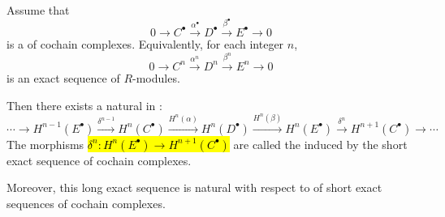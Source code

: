 \begin{theorem}
\begin{enumerate}
    Assume that 
    \[
    0 \longrightarrow C^\bullet \xrightarrow{\alpha^\bullet} D^\bullet \xrightarrow{\beta^\bullet} E^\bullet \longrightarrow 0
    \]
    is a  
    of cochain complexes. Equivalently, for each integer $n$, 
    \[
    0 \to C^n \xrightarrow{\alpha^n} D^n \xrightarrow{\beta^n} E^n \to 0
    \]
    is an exact sequence of $R$-modules.

    Then there exists a natural  in :
    \[
    \cdots \longrightarrow H^{n-1}(E^\bullet) 
    \xrightarrow{\delta^{n-1}} H^{n}(C^\bullet)
    \xrightarrow{H^{n}(\alpha)} H^{n}(D^\bullet)
    \xrightarrow{H^{n}(\beta)} H^{n}(E^\bullet)
    \xrightarrow{\delta^{n}} H^{n+1}(C^\bullet)
    \longrightarrow \cdots
    \]
    The morphisms \hl{$\delta^{n}: H^{n}(E^\bullet) \to H^{n+1}(C^\bullet)$} are called the 
     induced by the short exact sequence of cochain complexes.

    Moreover, this long exact sequence is natural with respect to 
    of short exact sequences of cochain complexes.

\end{enumerate}
\end{theorem}

